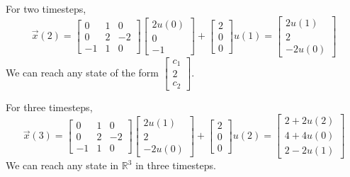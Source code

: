 {\begin{enumerate}
        For two timesteps,
        \[\vec{x}(2) =
        \begin{bmatrix}
            0 & 1 & 0 \\
            0 & 2 & -2 \\
            -1 & 1 & 0
        \end{bmatrix}
        \begin{bmatrix}
            2u(0) \\ 0 \\ -1
        \end{bmatrix}
        + \begin{bmatrix}
            2 \\ 0 \\ 0
        \end{bmatrix} u(1) =
        \begin{bmatrix}
            2u(1) \\ 2 \\ -2u(0)
        \end{bmatrix}\]
        We can reach any state of the form $\begin{bmatrix} c_1 \\ 2 \\ c_2 \end{bmatrix}$. \\
        \newline

        For three timesteps,
        \[\vec{x}(3) =
        \begin{bmatrix}
            0 & 1 & 0 \\
            0 & 2 & -2 \\
            -1 & 1 & 0
        \end{bmatrix}
        \begin{bmatrix}
            2u(1) \\ 2 \\ -2u(0)
        \end{bmatrix}
        + \begin{bmatrix}
            2 \\ 0 \\ 0
        \end{bmatrix} u(2) =
        \begin{bmatrix}
            2 + 2u(2) \\ 4 + 4u(0) \\ 2 - 2u(1)
        \end{bmatrix}\]
        We can reach any state in $\mathbb{R}^3$ in three timesteps.


\end{enumerate}}
